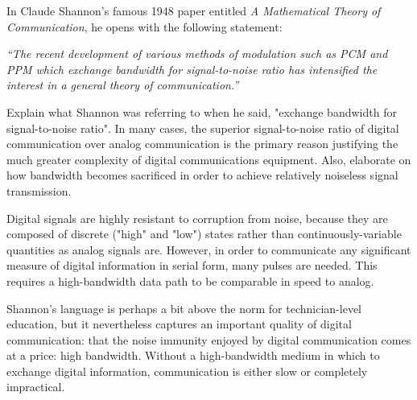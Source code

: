 

In Claude Shannon's famous 1948 paper entitled {\it A Mathematical Theory of Communication}, he opens with the following statement:

\vskip 10pt {\narrower \noindent \baselineskip5pt
{\it ``The recent development of various methods of modulation such as PCM and PPM which exchange bandwidth for signal-to-noise ratio has intensified the interest in a general theory of communication.''}
\par} \vskip 10pt

Explain what Shannon was referring to when he said, "exchange bandwidth for signal-to-noise ratio".  In many cases, the superior signal-to-noise ratio of digital communication over analog communication is the primary reason justifying the much greater complexity of digital communications equipment.  Also, elaborate on how bandwidth becomes sacrificed in order to achieve relatively noiseless signal transmission.







Digital signals are highly resistant to corruption from noise, because they are composed of discrete ("high" and "low") states rather than continuously-variable quantities as analog signals are.  However, in order to communicate any significant measure of digital information in serial form, many pulses are needed.  This requires a high-bandwidth data path to be comparable in speed to analog.







Shannon's language is perhaps a bit above the norm for technician-level education, but it nevertheless captures an important quality of digital communication: that the noise immunity enjoyed by digital communication comes at a price: high bandwidth.  Without a high-bandwidth medium in which to exchange digital information, communication is either slow or completely impractical.




